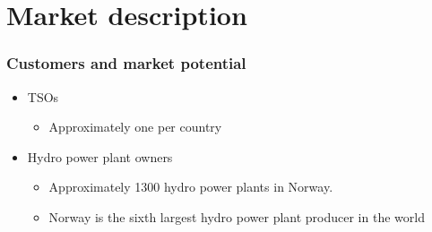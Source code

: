 \section{Market description}
\begin{frame}
	\frametitle{Customers and market potential}
	\begin{itemize}
		\item TSOs
			\begin{itemize}
				\item Approximately one per country
			\end{itemize}	
			\item Hydro power plant owners
			\begin{itemize}
				\item Approximately 1300 hydro power plants in Norway.
				\item Norway is the sixth largest hydro power plant producer in the world
			\end{itemize}
	\end{itemize}
\end{frame}
